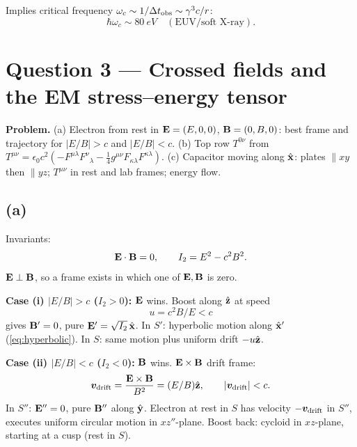 \documentclass[11pt]{article}
\begin{document}
Implies critical frequency $\omega_c \sim 1/\Delta t_{\rm obs} \sim \gamma^3 c/r$:
\[ \hbar\omega_c \sim \SI{80}{eV}\quad(\text{EUV/soft X-ray}). \]

\section*{Question 3 --- Crossed fields and the EM stress--energy tensor}

\textbf{Problem.} (a) Electron from rest in $\vb E=(E,0,0)$, $\vb B=(0,B,0)$: best frame and trajectory for $|E/B|>c$ and $|E/B|<c$. (b) Top row $T^{0\nu}$ from $T^{\mu\nu}=\epsilon_0c^2(-F^{\mu\lambda}F^\nu{}_\lambda - \tfrac14 g^{\mu\nu}F_{\kappa\lambda}F^{\kappa\lambda})$. (c) Capacitor moving along $\hat{\vb x}$: plates $\parallel xy$ then $\parallel yz$; $T^{\mu\nu}$ in rest and lab frames; energy flow.

\subsection*{(a)}

Invariants:
\[ \vb E\cdot\vb B = 0,\qquad I_2 = E^2 - c^2 B^2. \]
$\vb E\perp\vb B$, so a frame exists in which one of $\vb E,\vb B$ is zero.

\textbf{Case (i) $|E/B|>c$ ($I_2>0$):} $\vb E$ wins. Boost along $\hat{\vb z}$ at speed
\[ u = c^2 B/E < c \]
gives $\vb B'=0$, pure $\vb E'=\sqrt{I_2}\,\hat{\vb x}$. In $S'$: hyperbolic motion along $\hat{\vb x}'$ (\eqref{eq:hyperbolic}). In $S$: same motion plus uniform drift $-u\hat{\vb z}$.

\textbf{Case (ii) $|E/B|<c$ ($I_2<0$):} $\vb B$ wins. $\vb E\times\vb B$ drift frame:
\[ \bm v_{\rm drift} = \frac{\vb E\times\vb B}{B^2} = (E/B)\hat{\vb z},\qquad |\bm v_{\rm drift}|<c. \]
In $S''$: $\vb E''=0$, pure $\vb B''$ along $\hat{\vb y}$. Electron at rest in $S$ has velocity $-\bm v_{\rm drift}$ in $S''$, executes uniform circular motion in $xz''$-plane. Boost back: cycloid in $xz$-plane, starting at a cusp (rest in $S$).

\begin{center}
\end{center}
\end{document}
